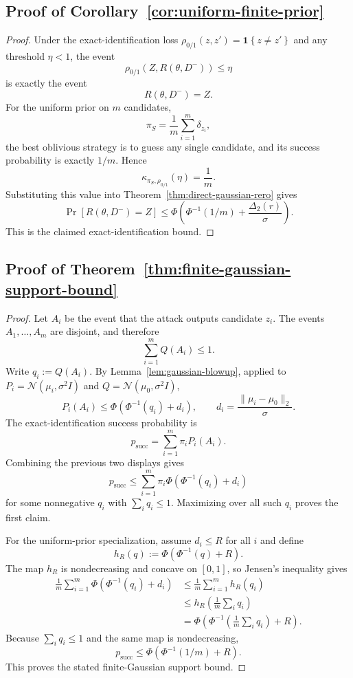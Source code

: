 \documentclass[conference,compsoc]{IEEEtran}
\newcommand{\ind}[1]{\mathbf{1}\!\left\{#1\right\}}
\begin{document}
\subsection{Proof of Corollary~\ref{cor:uniform-finite-prior}}

\begin{proof}
Under the exact-identification loss $\rho_{0/1}(z,z')=\ind{z\neq z'}$ and any threshold $\eta<1$, the event
\[
\rho_{0/1}(Z,R(\theta,D^-))\le \eta
\]
is exactly the event
\[
R(\theta,D^-)=Z.
\]
For the uniform prior on $m$ candidates,
\[
\pi_S=\frac{1}{m}\sum_{i=1}^m \delta_{z_i},
\]
the best oblivious strategy is to guess any single candidate, and its success probability is exactly $1/m$. Hence
\[
\kappa_{\pi_S,\rho_{0/1}}(\eta)=\frac{1}{m}.
\]
Substituting this value into Theorem~\ref{thm:direct-gaussian-rero} gives
\[
\Pr[R(\theta,D^-)=Z]
\le
\Phi\!\left(\Phi^{-1}(1/m)+\frac{\Delta_2(r)}{\sigma}\right).
\]
This is the claimed exact-identification bound.
\end{proof}

\subsection{Proof of Theorem~\ref{thm:finite-gaussian-support-bound}}

\begin{proof}
Let $A_i$ be the event that the attack outputs candidate $z_i$. The events $A_1,\ldots,A_m$ are disjoint, and therefore
\[
\sum_{i=1}^m Q(A_i)\le 1.
\]
Write $q_i:=Q(A_i)$. By Lemma~\ref{lem:gaussian-blowup}, applied to $P_i=\mathcal N(\mu_i,\sigma^2 I)$ and $Q=\mathcal N(\mu_0,\sigma^2 I)$,
\[
P_i(A_i)\le \Phi\!\left(\Phi^{-1}(q_i)+d_i\right),
\qquad
 d_i=\frac{\|\mu_i-\mu_0\|_2}{\sigma}.
\]
The exact-identification success probability is
\[
p_{\mathrm{succ}}=\sum_{i=1}^m \pi_i P_i(A_i).
\]
Combining the previous two displays gives
\[
p_{\mathrm{succ}}
\le
\sum_{i=1}^m \pi_i\Phi\!\left(\Phi^{-1}(q_i)+d_i\right)
\]
for some nonnegative $q_i$ with $\sum_i q_i\le 1$. Maximizing over all such $q_i$ proves the first claim.

For the uniform-prior specialization, assume $d_i\le R$ for all $i$ and
define
\[
h_R(q):=\Phi\!\left(\Phi^{-1}(q)+R\right).
\]
The map $h_R$ is nondecreasing and concave on $[0,1]$, so Jensen's
inequality gives
\[
\begin{aligned}
\frac{1}{m}\sum_{i=1}^m
\Phi\!\left(\Phi^{-1}(q_i)+d_i\right)
&\le
\frac{1}{m}\sum_{i=1}^m h_R(q_i) \\
&\le
h_R\!\left(\frac{1}{m}\sum_i q_i\right) \\
&=
\Phi\!\left(
\Phi^{-1}\!\left(\frac{1}{m}\sum_i q_i\right)+R
\right).
\end{aligned}
\]
Because $\sum_i q_i\le 1$ and the same map is nondecreasing,
\[
p_{\mathrm{succ}}
\le
\Phi\!\left(\Phi^{-1}(1/m)+R\right).
\]
This proves the stated finite-Gaussian support bound.
\end{proof}
\end{document}

